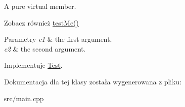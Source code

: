 A pure virtual member. 

\begin{DoxySeeAlso}{Zobacz również}
\hyperlink{classTest_af7115d71dda64654a7104c24f130e8d0}{test\-Me()} 
\end{DoxySeeAlso}

\begin{DoxyParams}{Parametry}
{\em c1} & the first argument. \\
\hline
{\em c2} & the second argument. \\
\hline
\end{DoxyParams}


Implementuje \hyperlink{classTest_a3edb9fdc1e9f0d5274b57386ab03704c}{Test}.



Dokumentacja dla tej klasy została wygenerowana z pliku\-:\begin{DoxyCompactItemize}
\item 
src/main.\-cpp\end{DoxyCompactItemize}
